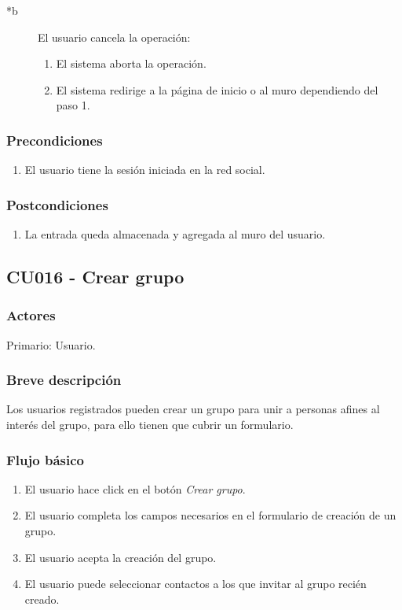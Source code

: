 \documentclass[12pt, a4paper, titlepage]{article}
\begin{document}
\begin{description}
	\item [*b] El usuario cancela la operación:
	\begin{enumerate}
		\item El sistema aborta la operación.
		\item El sistema redirige a la página de inicio o al muro dependiendo del paso 1.
	\end{enumerate}
\end{description}

\subsubsection{Precondiciones}
\begin{enumerate}
	\item El usuario tiene la sesión iniciada en la red social.
\end{enumerate}
\subsubsection{Postcondiciones}
\begin{enumerate}
	\item La entrada queda almacenada y agregada al muro del usuario.
\end{enumerate}


\subsection{CU016 - Crear grupo}
\subsubsection{Actores}
Primario: Usuario.
\subsubsection{Breve descripción}
Los usuarios registrados pueden crear un grupo para unir a personas afines al interés del grupo, para ello tienen que cubrir un formulario.
\subsubsection{Flujo básico}

	\begin{enumerate}
		\item El usuario hace click en el botón \textit{Crear grupo}.
		\item El usuario completa los campos necesarios en el formulario de creación de un grupo.
		\item El usuario acepta la creación del grupo.
		\item El usuario puede seleccionar contactos a los que invitar al grupo recién creado.
	\end{enumerate}
\end{document}
